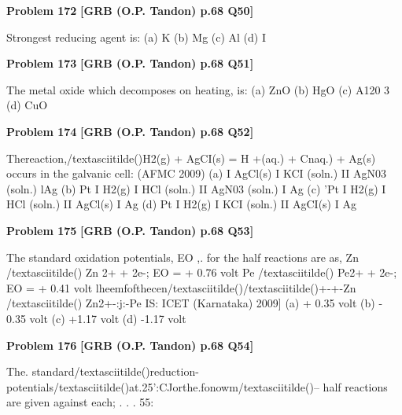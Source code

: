 \begin{problembox}
\textbf{Problem 172} \hfill \textbf{[GRB (O.P. Tandon) p.68 Q50]}
\label{q:ext-grb_all_questions-172}

Strongest reducing agent is: 
(a) K 
(b) Mg 
(c) Al 
(d) I
\end{problembox}

\begin{problembox}
\textbf{Problem 173} \hfill \textbf{[GRB (O.P. Tandon) p.68 Q51]}
\label{q:ext-grb_all_questions-173}

The metal oxide which decomposes on heating, is: 
(a) ZnO 
(b) HgO 
(c) A120 3 
(d) CuO
\end{problembox}

\begin{problembox}
\textbf{Problem 174} \hfill \textbf{[GRB (O.P. Tandon) p.68 Q52]}
\label{q:ext-grb_all_questions-174}

Thereaction,/textasciitilde()H2(g) + AgCI(s) = H +(aq.) + Cnaq.) + Ag(s) 
occurs in the galvanic cell: 
(AFMC 2009) 
(a) 
I AgCl(s) I KCI (soln.) II AgN03 (soln.) lAg 
(b) Pt I H2(g) I HCl (soln.) II AgN03 (soln.) I Ag 
(c) 'Pt I H2(g) I HCl (soln.) II AgCl(s) I Ag 
(d) Pt I H2(g) I KCI (soln.) II AgCI(s) I Ag
\end{problembox}

\begin{problembox}
\textbf{Problem 175} \hfill \textbf{[GRB (O.P. Tandon) p.68 Q53]}
\label{q:ext-grb_all_questions-175}

The standard oxidation potentials, EO ,. for the half reactions 
are as, 
Zn /textasciitilde() 
Zn 2+ + 2e-; 
EO = + 0.76 volt 
Pe /textasciitilde() 
Pe2+ + 2e-; 
EO = + 0.41 volt 
lheemfofthecen/textasciitilde()/textasciitilde()+-+-Zn /textasciitilde() 
Zn2+-:j:-Pe IS: 
ICET (Karnataka) 2009] 
(a) + 0.35 volt 
(b) - 0.35 volt 
(c) +1.17 volt 
(d) -1.17 volt
\end{problembox}

\begin{problembox}
\textbf{Problem 176} \hfill \textbf{[GRB (O.P. Tandon) p.68 Q54]}
\label{q:ext-grb_all_questions-176}

The. standard/textasciitilde()reduction-potentials/textasciitilde()at.25':CJorthe.fonowm/textasciitilde()--
half reactions are given against each; 
. 
. . 
55:
\end{problembox}

